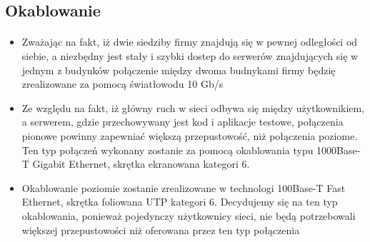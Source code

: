 \subsection{Okablowanie}
\paragraph{}


\begin{itemize}
  \item Zważając na fakt, iż dwie siedziby firmy znajdują się w pewnej odległości od siebie, a niezbędny jest stały i szybki dostep do serwerów znajdujących się w jednym z budynków połączenie między dwoma budnykami firmy będzię zrealizowane za pomocą światłowodu 10 Gb/s

  \item Ze względu na fakt, iż główny ruch w sieci odbywa się między użytkownikiem, a serwerem, gdzie przechowywany jest kod i aplikacje testowe, połączenia pionowe powinny zapewniać większą przepustowość, niż połączenia  poziome. Ten typ połączeń wykonany zostanie za pomocą okablowania typu 1000Base-T Gigabit Ethernet, skrętka ekranowana kategori 6.

  \item Okablowanie poziomie zostanie zrealizowane w technologi 100Base-T Fast Ethernet, skrętka foliowana UTP kategori 6. Decydujemy się na ten typ okablowania, ponieważ pojedynczy użytkownicy sieci, nie będą potrzebowali większej przepustowości niż oferowana przez ten typ połączenia

\end{itemize}